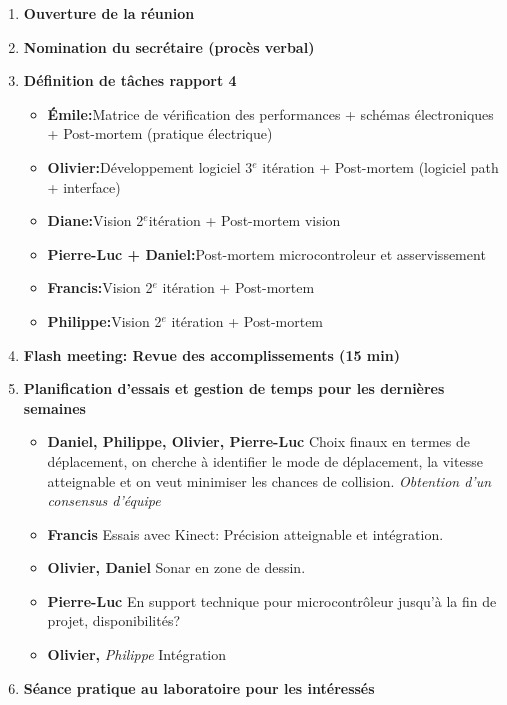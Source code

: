 \documentclass[12pt]{ULojpv}
\begin{document}
\entete
\begin{enumerate}
   \item \textbf{Ouverture de la réunion}
   \item \textbf{Nomination du secrétaire (procès verbal)}
   \item \textbf{Définition de tâches rapport 4}
   \begin{itemize}
   \item \textbf{Émile:}Matrice de vérification des performances + schémas électroniques + Post-mortem (pratique électrique)
   \item \textbf{Olivier:}Développement logiciel 3$^e$ itération + Post-mortem (logiciel path + interface)
   \item \textbf{Diane:}Vision 2$^e$itération + Post-mortem vision
   \item \textbf{Pierre-Luc + Daniel:}Post-mortem microcontroleur et asservissement
   \item \textbf{Francis:}Vision 2$^e$ itération + Post-mortem
   \item \textbf{Philippe:}Vision 2$^e$ itération + Post-mortem
   \end{itemize}
   \item \textbf{Flash meeting: Revue des accomplissements (15 min)}
   \item \textbf{Planification d'essais et gestion de temps pour les dernières semaines}
   \begin{itemize}
   \item \textbf{Daniel, Philippe, Olivier, Pierre-Luc} Choix finaux en termes de déplacement, on cherche à identifier le mode de déplacement, la vitesse atteignable et on veut minimiser les chances de collision. \textit{Obtention d'un consensus d'équipe}
   \item \textbf{Francis} Essais avec Kinect: Précision atteignable et intégration.
   \item \textbf{Olivier, Daniel} Sonar en zone de dessin.
   \item \textbf{Pierre-Luc} En support technique pour microcontrôleur jusqu'à la fin de projet, disponibilités?
   \item \textbf{Olivier,} \textit{Philippe} Intégration
   \end{itemize}    
   \item \textbf{Séance pratique au laboratoire pour les intéressés}
\end{enumerate}
   
\end{document}

